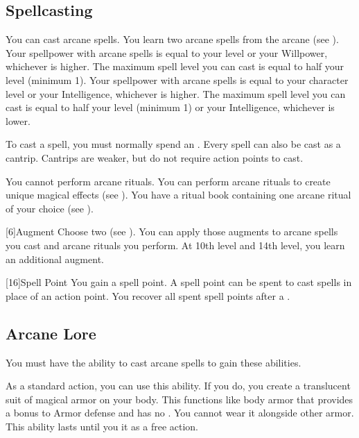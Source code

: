     \subsection{Spellcasting}

        You can cast arcane spells.
        You learn two arcane spells from the arcane  (see ).
         Your spellpower with arcane spells is equal to your level or your Willpower, whichever is higher.
        The maximum spell level you can cast is equal to half your level (minimum 1).
         Your spellpower with arcane spells is equal to your character level or your Intelligence, whichever is higher.
        The maximum spell level you can cast is equal to half your level (minimum 1) or your Intelligence, whichever is lower.

        To cast a spell, you must normally spend an .
        Every spell can also be cast as a cantrip.
        Cantrips are weaker, but do not require action points to cast.

         You cannot perform arcane rituals.
         You can perform arcane rituals to create unique magical effects (see ).
        You have a ritual book containing one arcane ritual of your choice (see ).

        [6]{Augment}
        Choose two  (see ).
        You can apply those augments to arcane spells you cast and arcane rituals you perform.
        At 10th level and 14th level, you learn an additional augment.

        [16]{Spell Point}
        You gain a spell point.
        A spell point can be spent to cast spells in place of an action point.
        You recover all spent spell points after a .

    \subsection{Arcane Lore}
        You must have the ability to cast arcane spells to gain these abilities.

         As a standard action, you can use this ability.
        If you do, you create a translucent suit of magical armor on your body.
        This functions like body armor that provides a  bonus to Armor defense and has no .
        You cannot wear it alongside other armor.
        This ability lasts until you  it as a free action.

